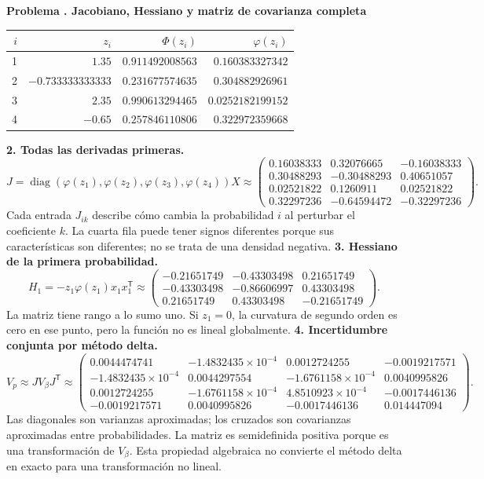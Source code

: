 \documentclass[11pt,a4paper]{article}
\newcommand{\T}{^{\mathsf T}}
\DeclareMathOperator{\diag}{diag}
\theoremstyle{definition}
\newcounter{problema}
\newenvironment{resuelto}[1]{\refstepcounter{problema}\par\medskip\Needspace{6\baselineskip}\textbf{Problema \theproblema. #1}\par}{\par\medskip}
\begin{document}
\begin{resuelto}{Jacobiano, Hessiano y matriz de covarianza completa}
\begin{center}\small\begin{tabular}{rrrr}
\toprule
$i$&$z_i$&$\Phi(z_i)$&$\varphi(z_i)$\\
\midrule
1&$1.35$&$0.911492008563$&$0.160383327342$\\
2&$-0.733333333333$&$0.231677574635$&$0.304882926961$\\
3&$2.35$&$0.990613294465$&$0.0252182199152$\\
4&$-0.65$&$0.257846110806$&$0.322972359668$\\
\bottomrule\end{tabular}\end{center}
\textbf{2. Todas las derivadas primeras.}
\[
J=\diag(\varphi(z_1),\varphi(z_2),\varphi(z_3),\varphi(z_4))X\approx\begin{pmatrix}0.16038333&0.32076665&-0.16038333\\0.30488293&-0.30488293&0.40651057\\0.02521822&0.1260911&0.02521822\\0.32297236&-0.64594472&-0.32297236\end{pmatrix}.
\]
Cada entrada $J_{ik}$ describe cómo cambia la probabilidad $i$ al perturbar el coeficiente $k$. La cuarta fila puede tener signos diferentes porque sus características son diferentes; no se trata de una densidad negativa.
\textbf{3. Hessiano de la primera probabilidad.}
\[
H_1=-z_1\varphi(z_1)x_1x_1\T\approx\begin{pmatrix}-0.21651749&-0.43303498&0.21651749\\-0.43303498&-0.86606997&0.43303498\\0.21651749&0.43303498&-0.21651749\end{pmatrix}.
\]
La matriz tiene rango a lo sumo uno. Si $z_1=0$, la curvatura de segundo orden es cero en ese punto, pero la función no es lineal globalmente.
\textbf{4. Incertidumbre conjunta por método delta.}
\[
V_p\approx JV_\beta J\T\approx\begin{pmatrix}0.0044474741&-1.4832435\times10^{-4}&0.0012724255&-0.0019217571\\-1.4832435\times10^{-4}&0.0044297554&-1.6761158\times10^{-4}&0.0040995826\\0.0012724255&-1.6761158\times10^{-4}&4.8510923\times10^{-4}&-0.0017446136\\-0.0019217571&0.0040995826&-0.0017446136&0.014447094\end{pmatrix}.
\]
Las diagonales son varianzas aproximadas; los cruzados son covarianzas aproximadas entre probabilidades. La matriz es semidefinida positiva porque es una transformación de $V_\beta$. Esta propiedad algebraica no convierte el método delta en exacto para una transformación no lineal.

\end{resuelto}
\end{document}
